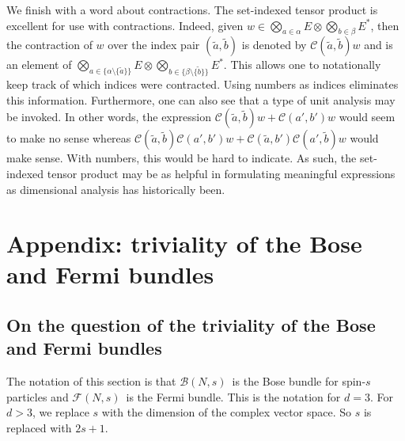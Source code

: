 \documentclass[11pt]{article}
\theoremstyle{remark}
\begin{document}
We finish with a word about contractions. The set-indexed tensor product
is excellent for use with contractions. Indeed, given $w \in
\bigotimes_{a \in \alpha} E \otimes \bigotimes_{b \in \beta} E^{*}$,
then the contraction of $w$ over the index pair $(\tilde a, \tilde b)$
is denoted by $\ensuremath{\mathcal{C}}(\tilde a, \tilde b) w$ and is an element of
$\bigotimes_{a \in \{\alpha \setminus \{\tilde a\} \}} 
E \otimes \bigotimes_{b \in \{\beta \setminus \{\tilde b \}\} }
E^{*}$. This allows one to notationally keep track of which indices
were contracted. Using numbers as indices eliminates this
information. Furthermore, one can also see that a type of unit
analysis may be invoked. In other words, the expression $
\ensuremath{\mathcal{C}}(\tilde a, \tilde b) w + \ensuremath{\mathcal{C}}(a', {b'}) w$ would seem to make
no sense whereas 
$\ensuremath{\mathcal{C}}(\tilde a, \tilde b) \ensuremath{\mathcal{C}}(a',  b') w + 
\ensuremath{\mathcal{C}}(\tilde a,  b') \ensuremath{\mathcal{C}}( a', \tilde b) w$ would make sense. With
numbers, this would be hard to indicate. As such, the set-indexed tensor
product may be as
helpful in formulating meaningful expressions
 as dimensional analysis has historically been.

\clearpage

\section{Appendix: triviality of the Bose and Fermi bundles}

\subsection{On the 
question of the triviality of the Bose and Fermi
bundles} 
\label{a:triviality} \label{s:triv}


The notation of this section is that \ensuremath{\mathcal{B}(N, s)}\ is the Bose bundle
for spin-$s$ particles and \ensuremath{\ensuremath{\mathcal{F}}(N,s)}\ is the Fermi bundle. This is
the notation for $\ensuremath{d} =3$. For $\ensuremath{d} > 3$, we replace $s$ with the
dimension of the complex vector space. So $s$ is replaced with $2s
+1$. 
\end{document}

